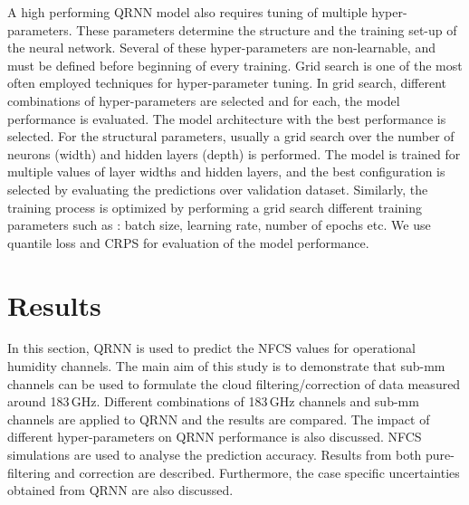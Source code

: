 \documentclass[amt, manuscript]{copernicus}
\begin{document}
A high performing QRNN model also requires tuning of multiple hyper-parameters. These parameters determine the structure and the training set-up of the neural network. Several of these hyper-parameters are non-learnable, and must be defined before beginning of every training. Grid search is one of the most often employed techniques for hyper-parameter tuning. In grid search, different combinations of hyper-parameters are selected and for each, the model performance is evaluated. The model architecture with the best performance is selected. For the structural parameters, usually a grid search over the number of neurons (width) and hidden layers (depth) is performed. The model is trained for multiple values of layer widths and hidden layers, and the best configuration is selected by evaluating the predictions over validation dataset. Similarly, the training process is optimized by performing a grid search different training parameters such as : batch size, learning rate, number of epochs etc. We use quantile loss and CRPS for evaluation of the model performance. 

\section{Results}
%
In this section, QRNN is used to predict the NFCS values for operational humidity channels. The main aim of this study is to demonstrate that sub-mm channels can be used to formulate the cloud filtering/correction of data measured around 183\,GHz. Different combinations of 183\,GHz channels and sub-mm channels are applied to QRNN and the results are compared. The impact of different hyper-parameters on QRNN performance is also discussed. NFCS simulations are used to analyse the prediction accuracy. Results from both pure-filtering and correction are described. Furthermore, the case specific uncertainties obtained from QRNN are also discussed.
 
\end{document}
